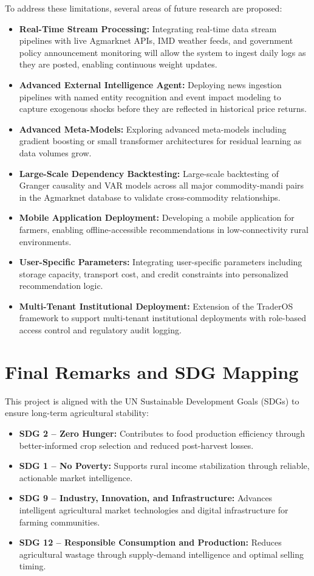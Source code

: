 \documentclass[12pt,a4paper]{report}
\theoremstyle{definition}
\theoremstyle{remark}
\begin{document}
To address these limitations, several areas of future research are proposed:
\begin{itemize}
    \item \textbf{Real-Time Stream Processing:} Integrating real-time data stream pipelines with live Agmarknet APIs, IMD weather feeds, and government policy announcement monitoring will allow the system to ingest daily logs as they are posted, enabling continuous weight updates.
    \item \textbf{Advanced External Intelligence Agent:} Deploying news ingestion pipelines with named entity recognition and event impact modeling to capture exogenous shocks before they are reflected in historical price returns.
    \item \textbf{Advanced Meta-Models:} Exploring advanced meta-models including gradient boosting or small transformer architectures for residual learning as data volumes grow.
    \item \textbf{Large-Scale Dependency Backtesting:} Large-scale backtesting of Granger causality and VAR models across all major commodity-mandi pairs in the Agmarknet database to validate cross-commodity relationships.
    \item \textbf{Mobile Application Deployment:} Developing a mobile application for farmers, enabling offline-accessible recommendations in low-connectivity rural environments.
    \item \textbf{User-Specific Parameters:} Integrating user-specific parameters including storage capacity, transport cost, and credit constraints into personalized recommendation logic.
    \item \textbf{Multi-Tenant Institutional Deployment:} Extension of the TraderOS framework to support multi-tenant institutional deployments with role-based access control and regulatory audit logging.
\end{itemize}

\section{Final Remarks and SDG Mapping}

This project is aligned with the UN Sustainable Development Goals (SDGs) to ensure long-term agricultural stability:
\begin{itemize}
    \item \textbf{SDG 2 -- Zero Hunger:} Contributes to food production efficiency through better-informed crop selection and reduced post-harvest losses.
    \item \textbf{SDG 1 -- No Poverty:} Supports rural income stabilization through reliable, actionable market intelligence.
    \item \textbf{SDG 9 -- Industry, Innovation, and Infrastructure:} Advances intelligent agricultural market technologies and digital infrastructure for farming communities.
    \item \textbf{SDG 12 -- Responsible Consumption and Production:} Reduces agricultural wastage through supply-demand intelligence and optimal selling timing.
\end{itemize}
\end{document}
